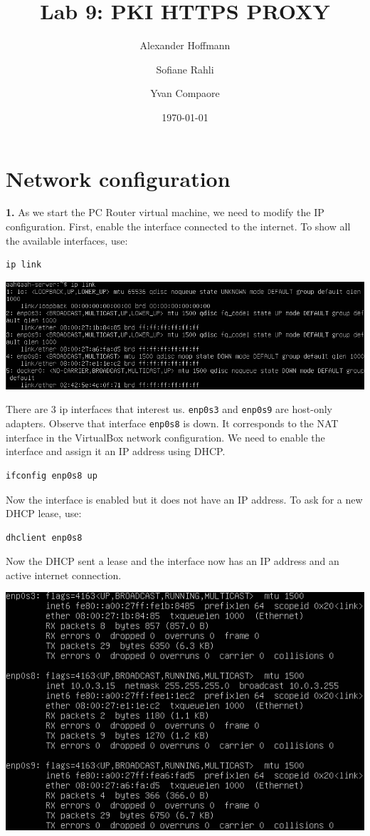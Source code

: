 \documentclass[12pt]{extarticle}
\title{Lab 9: PKI HTTPS PROXY}
\author{Alexander Hoffmann \and Sofiane Rahli \and Yvan Compaore}
\date{\today}
\begin{document}
\maketitle

\section{Network configuration}
\textbf{1.} As we start the PC Router virtual machine, we need to modify the IP configuration. First, enable the interface connected to the internet. To show all the available interfaces, use:
\begin{verbatim}
ip link
\end{verbatim}
\begin{center}
\includegraphics[scale=0.45]{resources/1-1-1.png}\\
\end{center}
There are 3 ip interfaces that interest us. \texttt{enp0s3} and \texttt{enp0s9} are host-only adapters. Observe that interface \texttt{enp0s8} is down. It corresponds to the NAT interface in the VirtualBox network configuration. We need to enable the interface and assign it an IP address using DHCP.
\begin{verbatim}
ifconfig enp0s8 up
\end{verbatim}
Now the interface is enabled but it does not have an IP address. To ask for a new DHCP lease, use:
\begin{verbatim}
dhclient enp0s8
\end{verbatim}
Now the DHCP sent a lease and the interface now has an IP address and an active internet connection.
\begin{center}
\includegraphics[scale=0.6]{resources/1-1-2.png}\\
\end{center}
\end{document}
